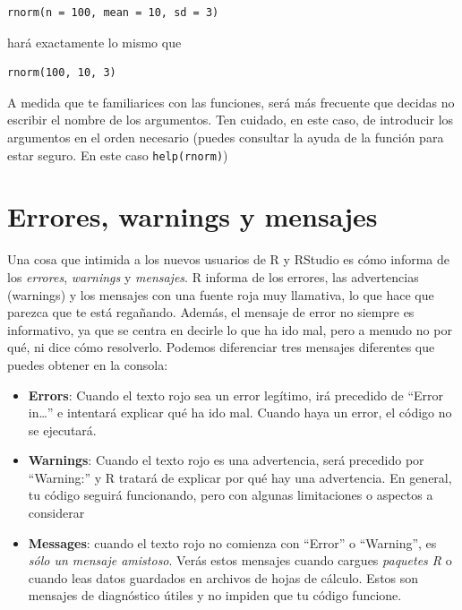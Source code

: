 \documentclass[
  letterpaper,
  DIV=11,
  numbers=noendperiod]{scrreprt}
\begin{document}
\begin{verbatim}
rnorm(n = 100, mean = 10, sd = 3)
\end{verbatim}

hará exactamente lo mismo que

\begin{verbatim}
rnorm(100, 10, 3)
\end{verbatim}

A medida que te familiarices con las funciones, será más frecuente que
decidas no escribir el nombre de los argumentos. Ten cuidado, en este
caso, de introducir los argumentos en el orden necesario (puedes
consultar la ayuda de la función para estar seguro. En este caso
\texttt{help(rnorm)})

\hypertarget{errores-warnings-y-mensajes}{%
\section{Errores, warnings y
mensajes}\label{errores-warnings-y-mensajes}}

Una cosa que intimida a los nuevos usuarios de R y RStudio es cómo
informa de los \emph{errores}, \emph{warnings} y \emph{mensajes}. R
informa de los errores, las advertencias (warnings) y los mensajes con
una fuente roja muy llamativa, lo que hace que parezca que te está
regañando. Además, el mensaje de error no siempre es informativo, ya que
se centra en decirle lo que ha ido mal, pero a menudo no por qué, ni
dice cómo resolverlo. Podemos diferenciar tres mensajes diferentes que
puedes obtener en la consola:

\begin{itemize}
\item
  \textbf{Errors}: Cuando el texto rojo sea un error legítimo, irá
  precedido de ``Error in\ldots{}'' e intentará explicar qué ha ido mal.
  Cuando haya un error, el código no se ejecutará.
\item
  \textbf{Warnings}: Cuando el texto rojo es una advertencia, será
  precedido por ``Warning:'' y R tratará de explicar por qué hay una
  advertencia. En general, tu código seguirá funcionando, pero con
  algunas limitaciones o aspectos a considerar
\item
  \textbf{Messages}: cuando el texto rojo no comienza con ``Error'' o
  ``Warning'', es \emph{sólo un mensaje amistoso}. Verás estos mensajes
  cuando cargues \emph{paquetes R} o cuando leas datos guardados en
  archivos de hojas de cálculo. Estos son mensajes de diagnóstico útiles
  y no impiden que tu código funcione.
\end{itemize}
\end{document}
